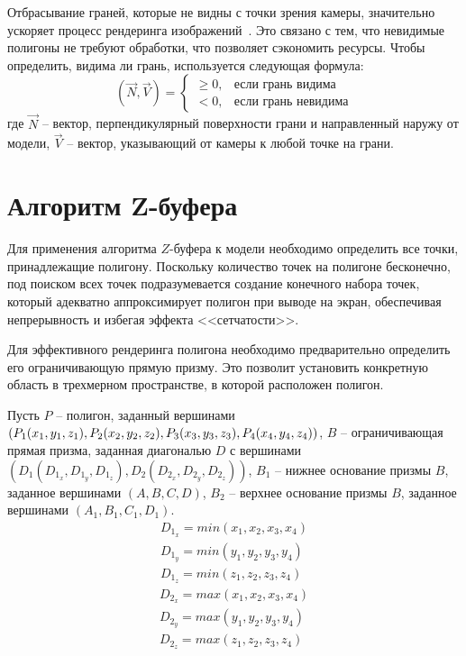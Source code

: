 Отбрасывание граней, которые не видны с точки зрения камеры, значительно ускоряет процесс рендеринга изображений~\cite{lit3}. Это связано с тем, что невидимые полигоны не требуют обработки, что позволяет сэкономить ресурсы. Чтобы определить, видима ли грань, используется следующая формула:
\begin{equation}
	(\vec{N}, \vec{V}) =
	\begin{cases}
		\geq 0, & \text{если грань видима} \\
		< 0, & \text{если грань невидима}
	\end{cases}
\end{equation}
где $\vec{N}$ -- вектор, перпендикулярный поверхности грани и направленный наружу от модели, $\vec{V}$ -- вектор, указывающий от камеры к любой точке на грани.

\section{Алгоритм Z-буфера}

Для применения алгоритма $Z$-буфера к модели необходимо определить все точки, принадлежащие полигону. Поскольку количество точек на полигоне бесконечно, под поиском всех точек подразумевается создание конечного набора точек, который адекватно аппроксимирует полигон при выводе на экран, обеспечивая непрерывность и избегая эффекта <<сетчатости>>.

Для эффективного рендеринга полигона необходимо предварительно определить его ограничивающую прямую призму. Это позволит установить конкретную область в трехмерном пространстве, в которой расположен полигон.

Пусть $P$ -- полигон, заданный вершинами $(P_1(x_1, y_1, z_1), P_2(x_2, y_2, z_2), \\ P_3(x_3, y_3, z_3), P_4(x_4, y_4, z_4))$, $B$ -- ограничивающая прямая призма, заданная диагональю $D$ с вершинами $(D_1(D_{1_x}, D_{1_y}, D_{1_z}), D_2(D_{2_x}, D_{2_y}, D_{2_z}))$, $B_1$ -- нижнее основание  призмы $B$, заданное вершинами $(A, B, C, D)$, $B_2$ -- верхнее основание призмы $B$, заданное вершинами $(A_1, B_1, C_1, D_1)$. 
\begin{equation}
	\begin{aligned}
		D_{1_x} = min(x_1, x_2, x_3, x_4) \\
		D_{1_y} = min(y_1, y_2, y_3, y_4) \\
		D_{1_z} = min(z_1, z_2, z_3, z_4) 
	\end{aligned}
\end{equation} 
\begin{equation}
	\begin{aligned}
		D_{2_x} = max(x_1, x_2, x_3, x_4) \\
		D_{2_y} = max(y_1, y_2, y_3, y_4) \\
		D_{2_z} = max(z_1, z_2, z_3, z_4) 
	\end{aligned}
\end{equation}

